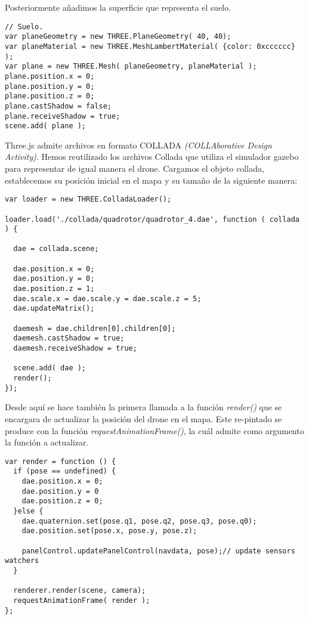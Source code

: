 Posteriormente añadimos la superficie que representa el suelo.\\

\begin{lstlisting}[caption=Superficie que representa el suelo del mapa.]
// Suelo. 
var planeGeometry = new THREE.PlaneGeometry( 40, 40);
var planeMaterial = new THREE.MeshLambertMaterial( {color: 0xcccccc} );
var plane = new THREE.Mesh( planeGeometry, planeMaterial );
plane.position.x = 0;
plane.position.y = 0;
plane.position.z = 0;
plane.castShadow = false;
plane.receiveShadow = true;
scene.add( plane );
\end{lstlisting}

Three.js admite archivos en formato COLLADA \emph{(COLLAborative Design Activity)}. Hemos reutilizado los archivos Collada que utiliza el simulador gazebo para representar de igual manera el drone. Cargamos el objeto collada, establecemos su posición inicial en el mapa y su tamaño de la siguiente manera:\\

\begin{lstlisting}[caption=Carga del objeto collada.]
var loader = new THREE.ColladaLoader();

loader.load('./collada/quadrotor/quadrotor_4.dae', function ( collada ) {
  
  dae = collada.scene;
  
  dae.position.x = 0;
  dae.position.y = 0;
  dae.position.z = 1;
  dae.scale.x = dae.scale.y = dae.scale.z = 5;
  dae.updateMatrix();
   
  daemesh = dae.children[0].children[0];
  daemesh.castShadow = true;
  daemesh.receiveShadow = true;
      
  scene.add( dae );
  render();
});
\end{lstlisting}

Desde aquí se hace también la primera llamada a la función \emph{render()} que se encargara de actualizar la posición del drone en el mapa. Este re-pintado se produce con la función \emph{requestAnimationFrame()}, la cuál admite como argumento la función a actualizar.

\begin{lstlisting}[caption=Carga del objeto collada.]
var render = function () {
  if (pose == undefined) {
    dae.position.x = 0;
    dae.position.y = 0
    dae.position.z = 0;
  }else {
    dae.quaternion.set(pose.q1, pose.q2, pose.q3, pose.q0);
    dae.position.set(pose.x, pose.y, pose.z);
      
    panelControl.updatePanelControl(navdata, pose);// update sensors watchers
  }

  renderer.render(scene, camera);
  requestAnimationFrame( render );
};
\end{lstlisting}

